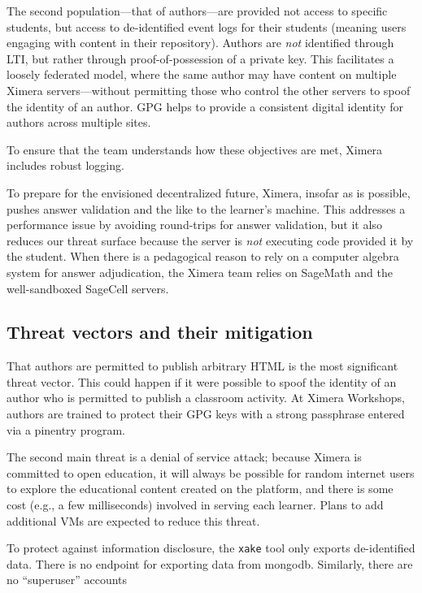 \documentclass{ximera}
\begin{document}
The second population---that of authors---are provided not access to
specific students, but access to de-identified event logs for their
students (meaning users engaging with content in their repository).
Authors are \textit{not} identified through LTI, but rather through
proof-of-possession of a private key.  This facilitates a loosely
federated model, where the same author may have content on multiple
Ximera servers---without permitting those who control the other
servers to spoof the identity of an author.  GPG helps to provide a
consistent digital identity for authors across multiple sites.

To ensure that the team understands how these objectives are met,
Ximera includes robust logging.

To prepare for the envisioned decentralized future, Ximera, insofar as
is possible, pushes answer validation and the like to the learner's
machine.  This addresses a performance issue by avoiding round-trips
for answer validation, but it also reduces our threat surface because
the server is \textit{not} executing code provided it by the student.
When there is a pedagogical reason to rely on a computer algebra
system for answer adjudication, the Ximera team relies on SageMath and
the well-sandboxed SageCell servers.

\subsection{Threat vectors and their mitigation}

That authors are permitted to publish arbitrary HTML is the most
significant threat vector.  This could happen if it were possible to
spoof the identity of an author who is permitted to publish a
classroom activity.  At Ximera Workshops, authors are trained to
protect their GPG keys with a strong passphrase entered via a pinentry
program.

The second main threat is a denial of service attack; because Ximera
is committed to open education, it will always be possible for random
internet users to explore the educational content created on the
platform, and there is some cost (e.g., a few milliseconds) involved
in serving each learner.  Plans to add additional VMs are expected to
reduce this threat.

To protect against information disclosure, the \texttt{xake} tool only
exports de-identified data.  There is no endpoint for exporting data
from mongodb.  Similarly, there are no ``superuser'' accounts
\end{document}
